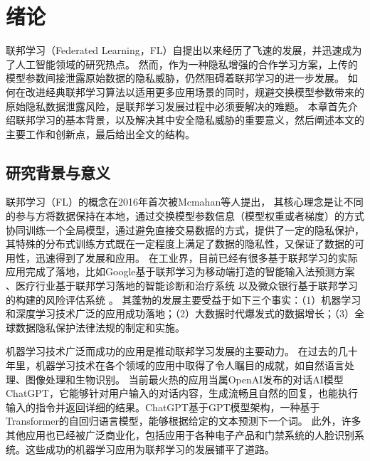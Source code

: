 \chapter{绪论}
联邦学习（Federated Learning，FL）自提出以来经历了飞速的发展，并迅速成为了人工智能领域的研究热点。
然而，作为一种隐私增强的合作学习方案，上传的模型参数间接泄露原始数据的隐私威胁，仍然阻碍着联邦学习的进一步发展。
如何在改进经典联邦学习算法以适用更多应用场景的同时，规避交换模型参数带来的原始隐私数据泄露风险，是联邦学习发展过程中必须要解决的难题。
本章首先介绍联邦学习的基本背景，以及解决其中安全隐私威胁的重要意义，然后阐述本文的主要工作和创新点，最后给出全文的结构。

\section{研究背景与意义} 
联邦学习（FL）的概念在2016年首次被Mcmahan等人\cite{mcmahan2017communication}提出，
其核心理念是让不同的参与方将数据保持在本地，通过交换模型参数信息（模型权重或者梯度）的方式协同训练一个全局模型，通过避免直接交易数据的方式，提供了一定的隐私保护，
其特殊的分布式训练方式既在一定程度上满足了数据的隐私性，又保证了数据的可用性，迅速得到了发展和应用\cite{bhagoji2019analyzing}。
在工业界，目前已经有很多基于联邦学习的实际应用完成了落地，比如Google基于联邦学习为移动端打造的智能输入法预测方案 \cite{hard2018federated}、医疗行业基于联邦学习落地的智能诊断和治疗系统 \cite{li2020deepfed}以及微众银行基于联邦学习的构建的风险评估系统 \cite{DBLP:conf/ndss/CaoF0G21}。
其蓬勃的发展主要受益于如下三个事实：（1）机器学习和深度学习技术广泛的应用成功落地；（2）大数据时代爆发式的数据增长；（3）全球数据隐私保护法律法规的制定和实施。

机器学习技术广泛而成功的应用是推动联邦学习发展的主要动力。
在过去的几十年里，机器学习技术在各个领域的应用中取得了令人瞩目的成就，如自然语言处理\cite{devlin2018bert}、图像处理\cite{zhu2020neural}和生物识别\cite{yin20193d}。
当前最火热的应用当属OpenAI发布的对话AI模型ChatGPT，它能够针对用户输入的对话内容，生成流畅且自然的回复，也能执行输入的指令并返回详细的结果。ChatGPT基于GPT模型架构\cite{brown2020language, chen2023gpt4}，一种基于Transformer的自回归语言模型，能够根据给定的文本预测下一个词。
此外，许多其他应用也已经被广泛商业化，包括应用于各种电子产品和门禁系统的人脸识别系统。这些成功的机器学习应用为联邦学习的发展铺平了道路。

